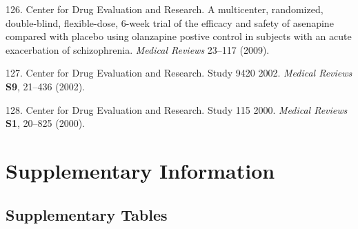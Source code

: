 \documentclass[9pt,english,,jou,floatsintext]{apa6}
\newcommand{\beginsupplement}{\setcounter{table}{0}  \renewcommand{\thetable}{S\arabic{table}} \setcounter{figure}{0} \renewcommand{\thefigure}{S\arabic{figure}}}
\begin{document}
\hypertarget{ref-Hera2009b}{}
126. Center for Drug Evaluation and Research. A multicenter, randomized,
double-blind, flexible-dose, 6-week trial of the efficacy and safety of
asenapine compared with placebo using olanzapine postive control in
subjects with an acute exacerbation of schizophrenia. \emph{Medical
Reviews} 23--117 (2009).

\hypertarget{ref-Study942022002}{}
127. Center for Drug Evaluation and Research. Study 9420 2002.
\emph{Medical Reviews} \textbf{S9}, 21--436 (2002).

\hypertarget{ref-Study1152000}{}
128. Center for Drug Evaluation and Research. Study 115 2000.
\emph{Medical Reviews} \textbf{S1}, 20--825 (2000).

\onecolumn
\clearpage
\beginsupplement

\section{Supplementary Information}\label{supplementary-information}

\subsection{Supplementary Tables}\label{supplementary-tables}
\end{document}
